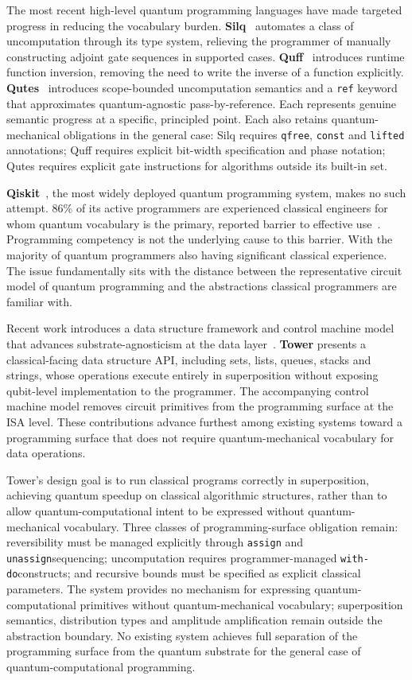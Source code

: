 The most recent high-level quantum programming languages have made targeted progress in reducing the vocabulary burden.
\textbf{Silq}~\cite{bichsel2020silq} automates a class of uncomputation through its type system, relieving the programmer of manually constructing adjoint gate sequences in supported cases.
\textbf{Quff}~\cite{wright2024quff} introduces runtime function inversion, removing the need to write the inverse of a function explicitly.
\textbf{Qutes}~\cite{faro2025qutes, reversiblelifetime2026} introduces scope-bounded uncomputation semantics and a \texttt{ref} keyword that approximates quantum-agnostic pass-by-reference.
Each represents genuine semantic progress at a specific, principled point.
Each also retains quantum-mechanical obligations in the general case: Silq requires \texttt{qfree}, \texttt{const} and \texttt{lifted} annotations; Quff requires explicit bit-width specification and phase notation; Qutes requires explicit gate instructions for algorithms outside its built-in set.

\textbf{Qiskit}~\cite{aleksandrowicz2019qiskit}, the most widely deployed quantum programming system, makes no such attempt.
86\% of its active programmers are experienced classical engineers for whom quantum vocabulary is the primary, reported barrier to effective use~\cite{ferreira2024qplusage}.
Programming competency is not the underlying cause to this barrier.
With the majority of quantum programmers also having significant classical experience.
The issue fundamentally sits with the distance between the representative circuit model of quantum programming and the abstractions classical programmers are familiar with.

Recent work introduces a data structure framework and control machine model that advances substrate-agnosticism at the data layer~\cite{yuan2025foundationalabstractions}.
\textbf{Tower} presents a classical-facing data structure API, including sets, lists, queues, stacks and strings, whose operations execute entirely in superposition without exposing qubit-level implementation to the programmer.
The accompanying control machine model removes circuit primitives from the programming surface at the ISA level.
These contributions advance furthest among existing systems toward a programming surface that does not require quantum-mechanical vocabulary for data operations.

Tower's design goal is to run classical programs correctly in superposition, achieving quantum speedup on classical algorithmic structures, rather than to allow quantum-computational intent to be expressed without quantum-mechanical vocabulary.
Three classes of programming-surface obligation remain: reversibility must be managed explicitly through \texttt{assign} and \texttt{unassign}sequencing; uncomputation requires programmer-managed \texttt{with-do}constructs; and recursive bounds must be specified as explicit classical parameters.
The system provides no mechanism for expressing quantum-computational primitives without quantum-mechanical vocabulary; superposition semantics, distribution types and amplitude amplification remain outside the abstraction boundary.
No existing system achieves full separation of the programming surface from the quantum substrate for the general case of quantum-computational programming.
